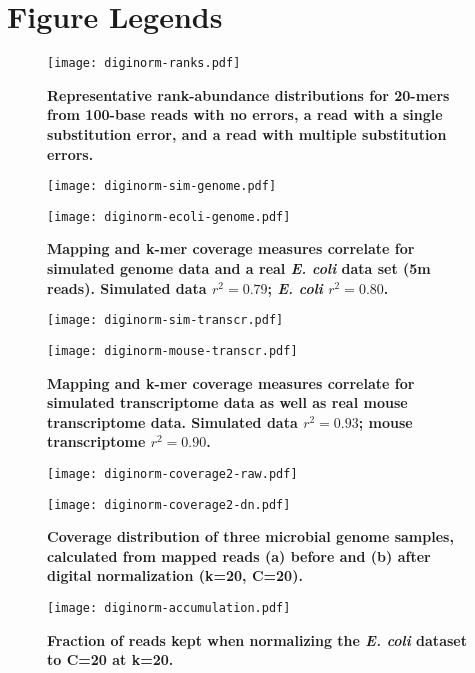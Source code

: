 \documentclass[10pt]{article}
\begin{document}
\section*{Figure Legends}

\begin{figure}[!ht]
\centerline{\texttt{[image: diginorm-ranks.pdf]}}
\caption{
{\bf Representative rank-abundance distributions for 20-mers from 100-base reads with no errors,
a read with a single substitution error, and a read with multiple
substitution errors.}}
\label{fig:rankabund}
\end{figure}

\begin{figure}[!ht]
\begin{center}
\centerline{\texttt{[image: diginorm-sim-genome.pdf]}}
\centerline{\texttt{[image: diginorm-ecoli-genome.pdf]}}
\end{center}
\caption{
{\bf Mapping and k-mer coverage measures correlate for simulated genome
data and a real {\em E. coli} data set (5m reads).  Simulated data $r^2 = 0.79$; {\em
E. coli} $r^2 = 0.80$.}
}
\label{fig:random}
\end{figure}

\begin{figure}[!ht]
\begin{center}
\centerline{\texttt{[image: diginorm-sim-transcr.pdf]}}
\centerline{\texttt{[image: diginorm-mouse-transcr.pdf]}}
\end{center}
\caption{
{\bf Mapping and k-mer coverage measures correlate for simulated transcriptome data as well as real mouse transcriptome data. Simulated data $r^2 = 0.93$;
mouse transcriptome $r^2 = 0.90$.}
}
\label{fig:transcripts}
\end{figure}

\begin{figure}[!ht]
\centerline{\texttt{[image: diginorm-coverage2-raw.pdf]}}
\centerline{\texttt{[image: diginorm-coverage2-dn.pdf]}}
\caption{
{\bf Coverage distribution of three microbial genome samples, calculated
from mapped reads (a) before and (b) after digital normalization (k=20, C=20).}}
\label{fig:coverage}
\end{figure}

\begin{figure}[!ht]
\centerline{\texttt{[image: diginorm-accumulation.pdf]}}
\caption{
{\bf Fraction of reads kept when normalizing the {\em E. coli} dataset to C=20 at k=20.}}
\label{fig:accumulate}
\end{figure}
\end{document}
